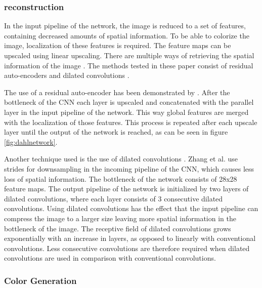 \subsubsection{reconstruction}
In the input pipeline of the network, the image is reduced to a set of features, containing decreased amounts of spatial information. To be able to colorize the image, localization of these features is required. The feature maps can be upscaled using linear upscaling. There are multiple ways of retrieving the spatial information of the image \cite{Charpiat} \cite{Zhang}. The methods tested in these paper consist of residual auto-encoders and dilated convolutions \cite{yu2015multi}.

The use of a residual auto-encoder has been demonstrated by \cite{Dahl}. After the bottleneck of the CNN each layer is upscaled and concatenated with the parallel layer in the input pipeline of the network. This way global features are merged with the localization of those features. This process is repeated after each upscale layer until the output of the network is reached, as can be seen in figure \ref{fig:dahlnetwork}.

%
Another technique used is the use of dilated convolutions \cite{yu2015multi}. Zhang et al. use strides for downsampling in the incoming pipeline of the CNN, which causes less loss of spatial information. The bottleneck of the network consists of 28x28 feature maps. The output pipeline of the network is initialized by two layers of dilated convolutions, where each layer consists of 3 consecutive dilated convolutions. Using dilated convolutions has the effect that the input pipeline can compress the image to a larger size leaving more spatial information in the bottleneck of the image. The receptive field of dilated convolutions grows exponentially with an increase in layers, as opposed to linearly with conventional convolutions. Less consecutive convolutions are therefore required when dilated convolutions are used in comparison with conventional convolutions.\\


\subsubsection{Color Generation}


